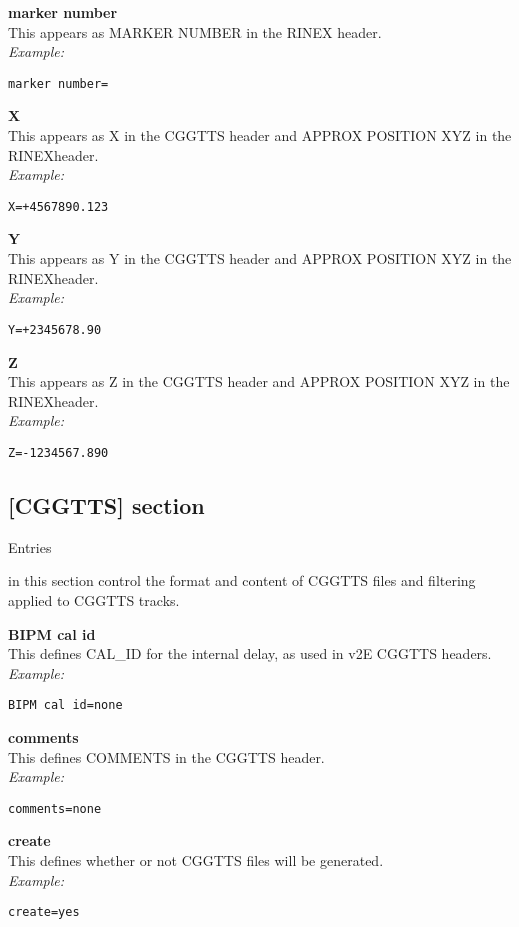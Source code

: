 {\bfseries marker number}\\
This appears as MARKER NUMBER in the RINEX header.\\
\textit{Example:}
\begin{lstlisting}
marker number=
\end{lstlisting}

{\bfseries X}\\
This appears as X in the CGGTTS header and APPROX POSITION XYZ in the RINEXheader.\\
\textit{Example:}
\begin{lstlisting}
X=+4567890.123
\end{lstlisting}

{\bfseries Y}\\
This appears as Y in the CGGTTS header and APPROX POSITION XYZ in the RINEXheader.\\
\textit{Example:}
\begin{lstlisting}
Y=+2345678.90
\end{lstlisting}

{\bfseries Z}\\
This appears as Z in the CGGTTS header and APPROX POSITION XYZ in the RINEXheader.\\
\textit{Example:}
\begin{lstlisting}
Z=-1234567.890 
\end{lstlisting}


\subsection{[CGGTTS] section }

\hypertarget{h:cggtts}{Entries} in this section control the format and content of CGGTTS files and filtering applied to CGGTTS tracks.

{\bfseries BIPM cal id}\\
This defines CAL\_ID for the internal delay, as used in v2E CGGTTS headers.\\
\textit{Example:}
\begin{lstlisting}
BIPM cal id=none
\end{lstlisting}

{\bfseries comments}\\
This defines COMMENTS in the CGGTTS header.\\
\textit{Example:}
\begin{lstlisting}
comments=none
\end{lstlisting}

{\bfseries create}\\
This defines whether or not CGGTTS files will be generated.\\
\textit{Example:}
\begin{lstlisting}
create=yes
\end{lstlisting}

